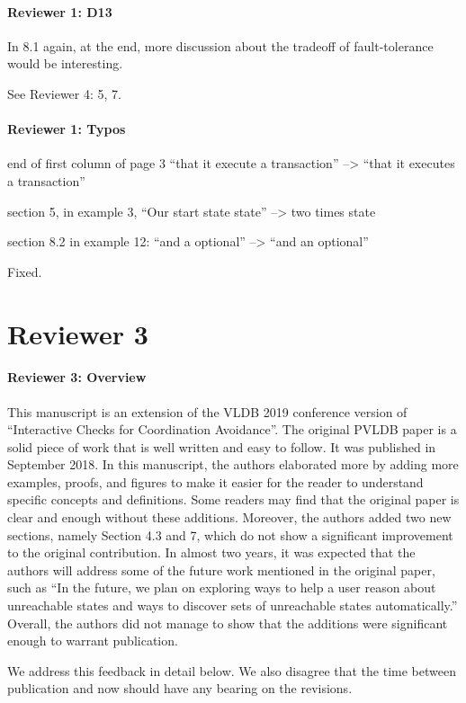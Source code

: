 \documentclass[9pt]{article}
\begin{document}
\begin{multicols*}{2}
\paragraph{Reviewer 1: D13}
\begin{feedback}
  In 8.1 again, at the end, more discussion about the tradeoff of
  fault-tolerance would be interesting.
\end{feedback}
See Reviewer 4: 5, 7.

\paragraph{Reviewer 1: Typos}
\begin{feedback}
  end of first column of page 3 ``that it execute a transaction'' --> ``that it
  executes a transaction''

  section 5, in example 3, ``Our start state state'' --> two times state

  section 8.2 in example 12: ``and a optional'' --> ``and an optional''
\end{feedback}
Fixed.

\section*{Reviewer 3}
\paragraph{Reviewer 3: Overview}
\begin{feedback}
  This manuscript is an extension of the VLDB 2019 conference version of
  ``Interactive Checks for Coordination Avoidance''. The original PVLDB paper
  is a solid piece of work that is well written and easy to follow. It was
  published in September 2018. In this manuscript, the authors elaborated more
  by adding more examples, proofs, and figures to make it easier for the reader
  to understand specific concepts and definitions. Some readers may find that
  the original paper is clear and enough without these additions. Moreover, the
  authors added two new sections, namely Section 4.3 and 7, which do not show a
  significant improvement to the original contribution. In almost two years, it
  was expected that the authors will address some of the future work mentioned
  in the original paper, such as ``In the future, we plan on exploring ways to
  help a user reason about unreachable states and ways to discover sets of
  unreachable states automatically.'' Overall, the authors did not manage to
  show that the additions were significant enough to warrant publication.
\end{feedback}
We address this feedback in detail below. We also disagree that the time
between publication and now should have any bearing on the revisions.


\end{multicols*}
\end{document}
